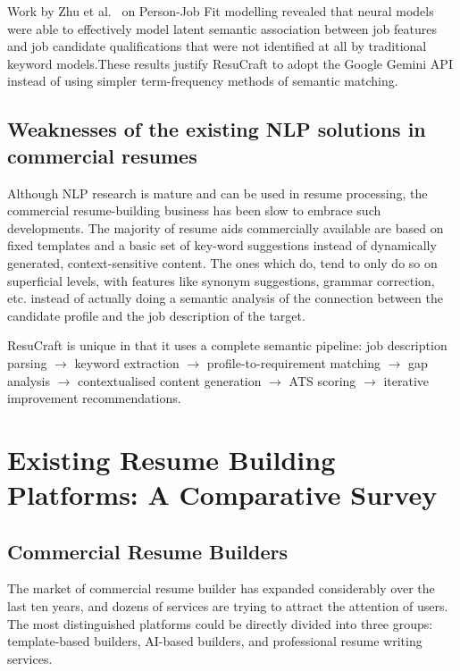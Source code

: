 \documentclass[12pt, a4paper, oneside]{report}
\begin{document}
Work by Zhu et al.\ \cite{zhu2018} on Person-Job Fit modelling revealed that neural models were able to effectively model latent semantic association between job features and job candidate qualifications that were not identified at all by traditional keyword models.These results justify ResuCraft to adopt the Google Gemini API\cite{gemini2023} instead of using simpler term-frequency methods of semantic matching.

\subsection{Weaknesses of the existing NLP solutions in commercial resumes}

Although NLP research is mature and can be used in resume processing, the commercial resume-building business has been slow to embrace such developments. The majority of resume aids commercially available are based on fixed templates and a basic set of key-word suggestions instead of dynamically generated, context-sensitive content. The ones which do, tend to only do so on superficial levels, with features like synonym suggestions, grammar correction, etc. instead of actually doing a semantic analysis of the connection between the candidate profile and the job description of the target.

ResuCraft is unique in that it uses a complete semantic pipeline: job description parsing $\rightarrow$ keyword extraction $\rightarrow$ profile-to-requirement matching $\rightarrow$ gap analysis $\rightarrow$ contextualised content generation \cite{gemini2023} $\rightarrow$ ATS scoring $\rightarrow$ iterative improvement recommendations.

\section{Existing Resume Building Platforms: A Comparative Survey}

\subsection{Commercial Resume Builders}

The market of commercial resume builder has expanded considerably over the last ten years, and dozens of services are trying to attract the attention of users. The most distinguished platforms could be directly divided into three groups: template-based builders, AI-based builders, and professional resume writing services.
\end{document}
